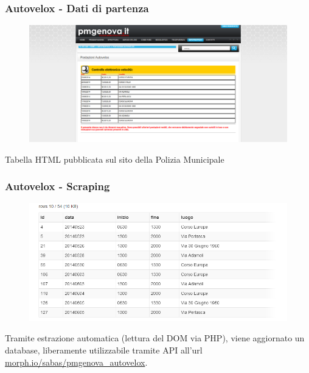 \documentclass{beamer}
\begin{document}
\begin{frame}
\frametitle{Autovelox - Dati di partenza} 
\begin{figure}
\includegraphics[width=\textwidth]{../img/Morph_PM_page.png} 
\end{figure}
Tabella HTML pubblicata sul sito della Polizia Municipale
\end{frame}

\begin{frame}
\frametitle{Autovelox - Scraping} 
\begin{figure}
\includegraphics[width=\textwidth]{../img/Morph_home_2_cut.png} 
\end{figure}
Tramite estrazione automatica (lettura del DOM via PHP), viene aggiornato un database, liberamente utilizzabile tramite API all'url \href{https://morph.io/sabas/pmgenova_autovelox}{morph.io/sabas/pmgenova\_autovelox}.
\end{frame}
\end{document}
